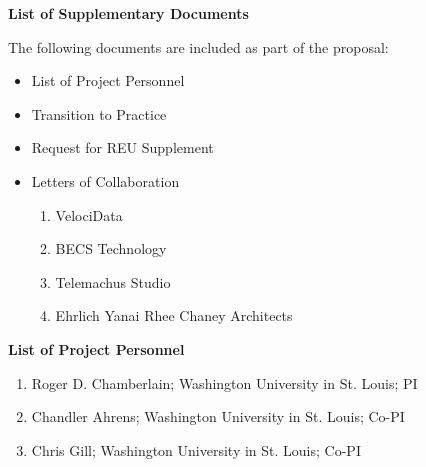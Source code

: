\documentclass[11pt]{article}
\begin{document}
\pagestyle{empty}
\thispagestyle{empty}

\begin{center}
\textbf{\Large List of Supplementary Documents}
\end{center}

The following documents are included as part of the proposal:

\begin{itemize}

\item List of Project Personnel

\item Transition to Practice

\item Request for REU Supplement

\item Letters of Collaboration

\begin{enumerate}

\item VelociData

\item BECS Technology

\item Telemachus Studio

\item Ehrlich Yanai Rhee Chaney Architects

\end{enumerate}

\end{itemize}

\newpage

\begin{center}
\textbf{\Large List of Project Personnel}
\end{center}

\begin{enumerate}

\item Roger D. Chamberlain; Washington University in St. Louis; PI

\item Chandler Ahrens; Washington University in St. Louis; Co-PI

\item Chris Gill; Washington University in St. Louis; Co-PI

\end{enumerate}
\end{document}
